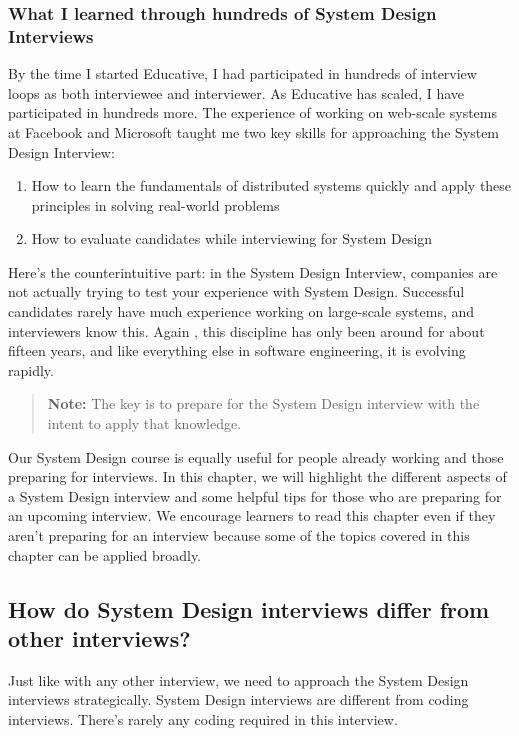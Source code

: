 \subsubsection{What I learned through hundreds of System Design Interviews}\label{5Ai-AQby7BVCxBidhX3m3}

By the time I started Educative, I had participated in hundreds of interview loops as both interviewee and interviewer. As Educative has scaled, I have participated in hundreds more. The experience of working on web-scale systems at Facebook and Microsoft taught me two key skills for approaching the System Design Interview:

\begin{enumerate}
\item
{}\label{Ggzh5pTw39SD5OD34_J0H}
How to learn the fundamentals of distributed systems quickly and apply these principles in solving real-world problems
\item
{}\label{uaDMkBB3F04VJuTLg7hyL}
How to evaluate candidates while interviewing for System Design
\end{enumerate}

Here's the counterintuitive part: in the System Design Interview, companies are not actually trying to test your experience with System Design. Successful candidates rarely have much experience working on large-scale systems, and interviewers know this. Again , this discipline has only been around for about fifteen years, and like everything else in software engineering, it is evolving rapidly.
\begin{quote}
\textbf{Note:} The key is to prepare for the System Design interview with the intent to apply that knowledge.
\end{quote}
Our System Design course is equally useful for people already working and those preparing for interviews. In this chapter, we will highlight the different aspects of a System Design interview and some helpful tips for those who are preparing for an upcoming interview. We encourage learners to read this chapter even if they aren't preparing for an interview because some of the topics covered in this chapter can be applied broadly.

\subsection{How do System Design interviews differ from other interviews?}\label{NQeNxrqfHqs-dvlwL9oyU}

Just like with any other interview, we need to approach the System Design interviews strategically. System Design interviews are different from coding interviews. There's rarely any coding required in this interview.

